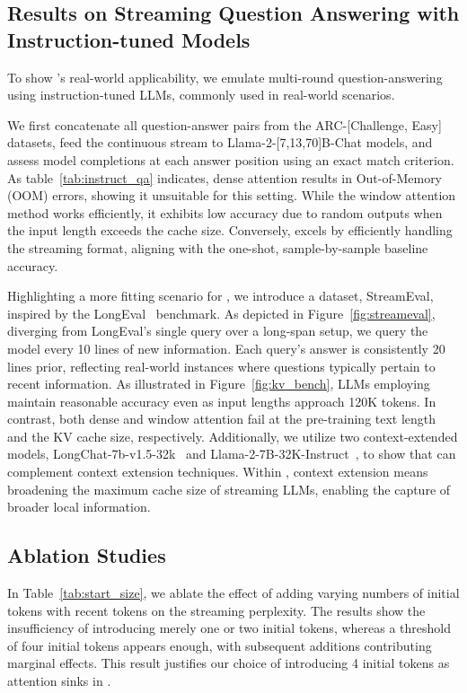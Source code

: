 
\subsection{Results on Streaming Question Answering with Instruction-tuned Models}
To show \method's real-world applicability, we emulate multi-round question-answering using instruction-tuned LLMs, commonly used in real-world scenarios.

We first concatenate all question-answer pairs from the ARC-[Challenge, Easy] datasets, feed the continuous stream to Llama-2-[7,13,70]B-Chat models, and assess model completions at each answer position using an exact match criterion. As table~\ref{tab:instruct_qa} indicates, dense attention results in Out-of-Memory (OOM) errors, showing it unsuitable for this setting. While the window attention method works efficiently, it exhibits low accuracy due to random outputs when the input length exceeds the cache size. Conversely, \method excels by efficiently handling the streaming format, aligning with the one-shot, sample-by-sample baseline accuracy.

Highlighting a more fitting scenario for \method, we introduce a dataset, StreamEval, inspired by the LongEval~\citep{longchat2023} benchmark. As depicted in Figure~\ref{fig:streameval}, diverging from LongEval's single query over a long-span setup, we query the model every 10 lines of new information. Each query's answer is consistently 20 lines prior, reflecting real-world instances where questions typically pertain to recent information. As illustrated in Figure~\ref{fig:kv_bench}, LLMs employing \method maintain reasonable accuracy even as input lengths approach 120K tokens. In contrast, both dense and window attention fail at the pre-training text length and the KV cache size, respectively. Additionally, we utilize two context-extended models, LongChat-7b-v1.5-32k~\citep{longchat2023} and Llama-2-7B-32K-Instruct~\citep{togetherlong}, to show that \method can complement context extension techniques. Within \method, context extension means broadening the maximum cache size of streaming LLMs, enabling the capture of broader local information.


\subsection{Ablation Studies}

 In Table~\ref{tab:start_size}, we ablate the effect of adding varying numbers of initial tokens with recent tokens on the streaming perplexity. The results show the insufficiency of introducing merely one or two initial tokens, whereas a threshold of four initial tokens appears enough, with subsequent additions contributing marginal effects. This result justifies our choice of introducing 4 initial tokens as attention sinks in \method.

